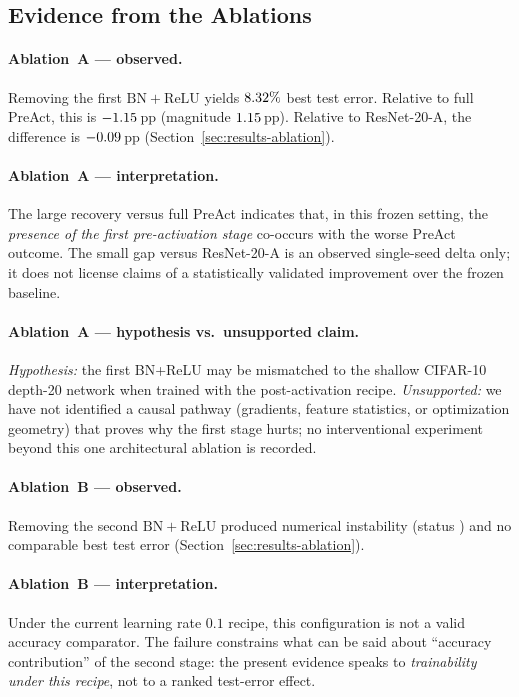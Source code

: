\subsection{Evidence from the Ablations}
\label{sec:disc-ablation}

\paragraph{Ablation~A --- observed.}
Removing the first $\mathrm{BN}{+}\mathrm{ReLU}$ yields $8.32\%$ best test error.
Relative to full PreAct, this is $-1.15$\,pp
(magnitude $1.15$\,pp).
Relative to ResNet-20-A, the difference is $-0.09$\,pp
(Section~\ref{sec:results-ablation}).

\paragraph{Ablation~A --- interpretation.}
The large recovery versus full PreAct indicates that, in this frozen setting, the
\emph{presence of the first pre-activation stage} co-occurs with the worse PreAct outcome.
The small gap versus ResNet-20-A is an observed single-seed delta only; it does not license
claims of a statistically validated improvement over the frozen baseline.

\paragraph{Ablation~A --- hypothesis vs.\ unsupported claim.}
\emph{Hypothesis:} the first BN+ReLU may be mismatched to the shallow CIFAR-10 depth-20 network when
trained with the post-activation recipe.
\emph{Unsupported:} we have not identified a causal pathway (gradients, feature statistics,
or optimization geometry) that proves why the first stage hurts; no interventional
experiment beyond this one architectural ablation is recorded.

\paragraph{Ablation~B --- observed.}
Removing the second $\mathrm{BN}{+}\mathrm{ReLU}$ produced numerical instability
(status \AblationBStatus) and no comparable best test error
(Section~\ref{sec:results-ablation}).

\paragraph{Ablation~B --- interpretation.}
Under the current learning rate $0.1$ recipe, this configuration is not a valid accuracy
comparator. The failure constrains what can be said about ``accuracy contribution'' of the
second stage: the present evidence speaks to \emph{trainability under this recipe}, not to a
ranked test-error effect.

